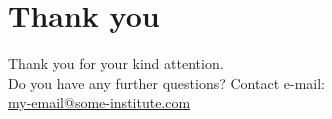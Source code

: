 \documentclass[utf8,compress,aspectratio=169]{beamer}
\begin{document}
\part{Thank you}
\begin{frame}[c]{\quad}{\quad}
\centering
Thank you for your kind attention.\\Do you have any further questions?
\vfill
Contact e-mail:\\[.5em]
\href{mailto:my-email@some-institute.com}{my-email@some-institute.com}
\end{frame}
\end{document}
